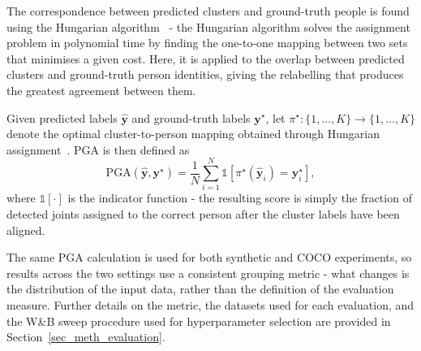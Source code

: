 The correspondence between predicted clusters and ground-truth people
is found using the Hungarian algorithm~\cite{kuhn1955hungarian} -
the Hungarian algorithm solves the assignment problem in polynomial time
by finding the one-to-one mapping between two sets that minimises a given cost.
Here,
it is applied to the overlap between predicted clusters and ground-truth person identities,
giving the relabelling that produces the greatest agreement between them.

Given predicted labels $\hat{\mathbf{y}}$ and ground-truth labels $\mathbf{y}^\star$,
let $\pi^\star : \{1,\dots,K\} \to \{1,\dots,K\}$ denote
the optimal cluster-to-person mapping obtained through Hungarian assignment~\cite{kuhn1955hungarian}.
PGA is then defined as
\begin{equation}
    \mathrm{PGA}(\hat{\mathbf{y}}, \mathbf{y}^\star)
    = \frac{1}{N}
      \sum_{i=1}^{N}
      \mathbb{1}\!\left[
          \pi^\star(\hat{\mathbf{y}}_i) = \mathbf{y}^\star_i
      \right],
    \label{eq:pga}
\end{equation}
where $\mathbb{1}[\cdot]$ is the indicator function -
the resulting score is simply the fraction of detected joints
assigned to the correct person after the cluster labels have been aligned.

The same PGA calculation is used for both synthetic and COCO experiments,
so results across the two settings use a consistent grouping metric -
what changes is the distribution of the input data,
rather than the definition of the evaluation measure.
Further details on the metric,
the datasets used for each evaluation,
and the W\&B sweep procedure used for hyperparameter selection
are provided in Section~\ref{sec_meth_evaluation}.
